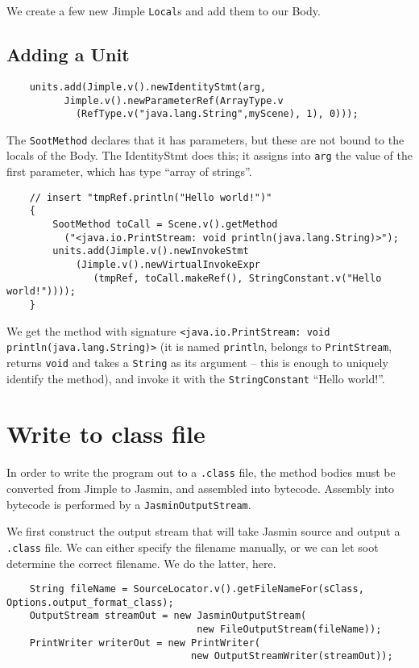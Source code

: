 \documentclass{article}
\begin{document}
We create a few new Jimple {\tt Local}s and add them to our Body.

\subsection{Adding a Unit}

\begin{verbatim}
    units.add(Jimple.v().newIdentityStmt(arg, 
          Jimple.v().newParameterRef(ArrayType.v
            (RefType.v("java.lang.String",myScene), 1), 0)));
\end{verbatim}

The {\tt SootMethod} declares that it has parameters, but these are not
bound to the locals of the Body.  The IdentityStmt does this; it assigns
into {\tt arg} the value of the first parameter, which has type ``array of
strings''.

\begin{verbatim}
    // insert "tmpRef.println("Hello world!")"
    {
        SootMethod toCall = Scene.v().getMethod
          ("<java.io.PrintStream: void println(java.lang.String)>");
        units.add(Jimple.v().newInvokeStmt
            (Jimple.v().newVirtualInvokeExpr
               (tmpRef, toCall.makeRef(), StringConstant.v("Hello world!"))));
    }
\end{verbatim}                      

We get the method with signature 
{\tt <java.io.PrintStream: void println(java.lang.String)>}
(it is named {\tt println}, belongs to {\tt PrintStream}, returns 
{\tt void} and
takes a {\tt String} as its argument -- this is enough to uniquely
identify the method), and invoke it with the {\tt StringConstant} 
``Hello world!''.

\section{Write to class file}

In order to write the program out to a {\tt .class} file, the method bodies 
must be converted from Jimple to Jasmin, and assembled into bytecode. Assembly 
into bytecode is performed by a {\tt JasminOutputStream}.

We first construct the output stream that will take Jasmin source and output a 
{\tt .class} file. We can either specify the filename manually, or we can let 
soot determine the correct filename. We do the latter, here.

\begin{verbatim}
    String fileName = SourceLocator.v().getFileNameFor(sClass, Options.output_format_class);
    OutputStream streamOut = new JasminOutputStream(
                                 new FileOutputStream(fileName));
    PrintWriter writerOut = new PrintWriter(
                                new OutputStreamWriter(streamOut));
\end{verbatim}
\end{document}
